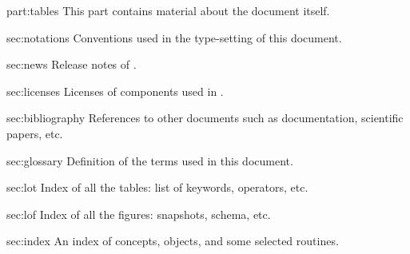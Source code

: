 
\begin{partDescription}{part:tables}
  {
    This part contains material about the document itself.
  }
\item[sec:notations]%
  Conventions used in the type-setting of this document.

\item[sec:news]%
  Release notes of \usdk.

\item[sec:licenses]%
  Licenses of components used in \usdk.

\item[sec:bibliography] References to other documents such as documentation,
  scientific papers, etc.

\item[sec:glossary]%
  Definition of the terms used in this document.

\item[sec:lot]%
  Index of all the tables: list of keywords, operators, etc.

\item[sec:lof]%
  Index of all the figures: snapshots, schema, etc.

\item[sec:index]
  An index of concepts, objects, and some selected routines.
\end{partDescription}


